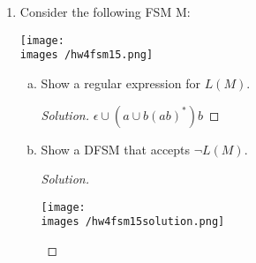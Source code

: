 \documentclass[10pt]{article}
\newcommand{\images}{/home/gparker/classes/341/images}
\begin{document}
\begin{enumerate}[1)]
\addtocounter{enumi}{5}
\item
Consider the following FSM M:

\begin{center}
\texttt{[image: \\images /hw4fsm15.png]}
\end{center}

\begin{enumerate}[a)]
\item
Show a regular expression for $L(M)$.
\begin{proof}[Solution]
$\epsilon \cup (a \cup b(ab)^*)b$
\end{proof}
\item
Show a DFSM that accepts $\lnot L(M)$.
\begin{proof}[Solution]$ $\\
\begin{center}
\texttt{[image: \\images /hw4fsm15solution.png]}
\end{center}
\end{proof}
\end{enumerate}

\addtocounter{enumi}{2}


\end{enumerate}
\end{document}
